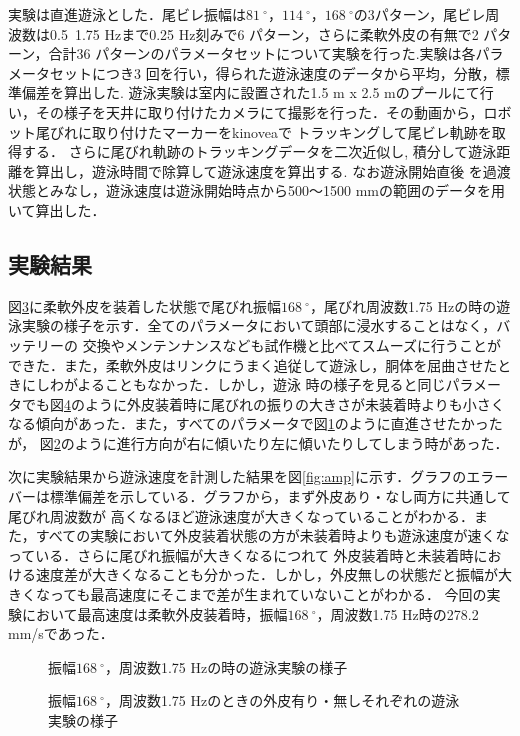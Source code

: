 実験は直進遊泳とした．尾ビレ振幅は$81\:^\circ$，$114\:^\circ$，$168\:^\circ$の3パターン，尾ビレ周波数は0.5~1.75 Hzまで0.25 Hz刻みで6 パターン，さらに柔軟外皮の有無で2 パターン，合計36 
パターンのパラメータセットについて実験を行った.実験は各パラメータセットにつき3 回を行い，得られた遊泳速度のデータから平均，分散，標準偏差を算出した.
遊泳実験は室内に設置された1.5 m x 2.5 mのプールにて行い，その様子を天井に取り付けたカメラにて撮影を行った．その動画から，ロボット尾びれに取り付けたマーカーをkinoveaで
トラッキングして尾ビレ軌跡を取得する．
さらに尾びれ軌跡のトラッキングデータを二次近似し, 積分して遊泳距離を算出し，遊泳時間で除算して遊泳速度を算出する. なお遊泳開始直後
を過渡状態とみなし，遊泳速度は遊泳開始時点から500～1500 mmの範囲のデータを用いて算出した．

\subsection{実験結果}
図\ref{fig:test_swim}に柔軟外皮を装着した状態で尾びれ振幅$168\:^\circ$，尾びれ周波数1.75 Hzの時の遊泳実験の様子を示す．全てのパラメータにおいて頭部に浸水することはなく，バッテリーの
交換やメンテンナンスなども試作機と比べてスムーズに行うことができた．また，柔軟外皮はリンクにうまく追従して遊泳し，胴体を屈曲させたときにしわがよることもなかった．しかし，遊泳
時の様子を見ると同じパラメータでも図\ref{fig:kukkyoku}のように外皮装着時に尾びれの振りの大きさが未装着時よりも小さくなる傾向があった．また，すべてのパラメータで図\ref{fig:str}のように直進させたかったが，
図\ref{fig:right}のように進行方向が右に傾いたり左に傾いたりしてしまう時があった．

次に実験結果から遊泳速度を計測した結果を図\ref{fig:amp}に示す．グラフのエラーバーは標準偏差を示している．グラフから，まず外皮あり・なし両方に共通して尾びれ周波数が
高くなるほど遊泳速度が大きくなっていることがわかる．また，すべての実験において外皮装着状態の方が未装着時よりも遊泳速度が速くなっている．さらに尾びれ振幅が大きくなるにつれて
外皮装着時と未装着時における速度差が大きくなることも分かった．しかし，外皮無しの状態だと振幅が大きくなっても最高速度にそこまで差が生まれていないことがわかる．
今回の実験において最高速度は柔軟外皮装着時，振幅$168\:^\circ$，周波数1.75 Hz時の278.2 mm/sであった．

\begin{figure}[htbp]
   \centering  
   \begin{subfigure}[b]{1\linewidth}
       \centering
       \label{fig:str}
   \end{subfigure}
   \begin{subfigure}[b]{1\linewidth}
       \centering
       \label{fig:right}
   \end{subfigure}
   \caption{振幅$168\:^\circ$，周波数1.75 Hzの時の遊泳実験の様子}
   \label{fig:test_swim}
\end{figure}
\begin{figure}[htbp]
    \centering
    \caption{振幅$168\:^\circ$，周波数1.75 Hzのときの外皮有り・無しそれぞれの遊泳実験の様子}
    \label{fig:kukkyoku}
\end{figure}

